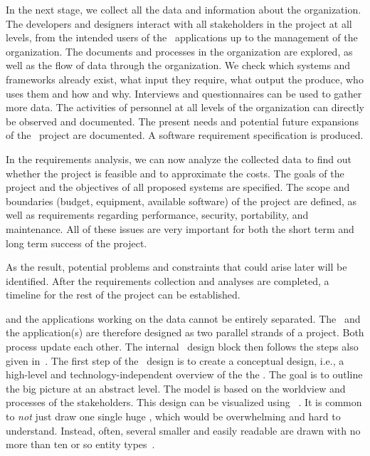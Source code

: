 In the next stage, we collect all the data and information about the organization.
The developers and designers interact with all stakeholders in the project at all levels, from the intended users of the \db\ applications up to the management of the organization.
The documents and processes in the organization are explored, as well as the flow of data through the organization.
We check which systems and frameworks already exist, what input they require, what output the produce, who uses them and how and why.
Interviews and questionnaires can be used to gather more data.
The activities of personnel at all levels of the organization can directly be observed and documented.
The present needs and potential future expansions of the \db\ project are documented.
A software requirement specification is produced.

In the requirements analysis, we can now analyze the collected data to find out whether the project is feasible and to approximate the costs.
The goals of the project and the objectives of all proposed systems are specified.
The scope and boundaries (budget, equipment, available software) of the project are defined, as well as requirements regarding performance, security, portability, and maintenance.
All of these issues are very important for both the short term and long term success of the project.

As the result, potential problems and constraints that could arise later will be identified.
After the requirements collection and analyses are completed, a timeline for the rest of the project can be established.

 and the applications working on the data cannot be entirely separated.
The \db\ and the application(s) are therefore designed as two parallel strands of a project.
Both process update each other.
The internal \db\ design block then follows the steps also given in~\cite{EN2015FODS}.
The first step of the \db\ design is to create a conceptual design, i.e., a high-level and technology-independent overview of the the \db.
The goal is to outline the big picture at an abstract level.
The model is based on the worldview and processes of the stakeholders.
This design can be visualized using ~\cite{WF1995DHQDM,B1990CMERMO}.
It is common to \emph{not} just draw one single huge , which would be overwhelming and hard to understand.
Instead, often, several smaller and easily readable  are drawn with no more than ten or so entity types~\cite{WF1995DHQDM}.


